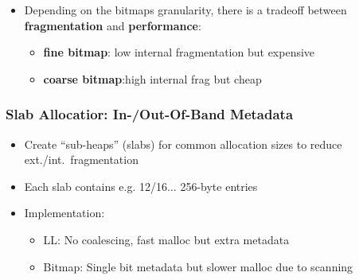 \begin{itemize}
    \item Depending on the bitmaps granularity, there is a tradeoff between \textbf{fragmentation} and \textbf{performance}:%
          \begin{itemize}
              \item \textbf{fine bitmap}: low internal fragmentation but expensive  %
              \item \textbf{coarse bitmap}:high internal frag but cheap  %
          \end{itemize}
\end{itemize}


\subsubsection{Slab Allocatior: In-/Out-Of-Band Metadata}

\begin{itemize}
    \item Create ``sub-heaps'' (slabs) for common allocation sizes to reduce ext./int.\ fragmentation
    \item Each slab contains e.g. 12/16$\dots$ 256-byte entries
    \item Implementation:
          \begin{itemize}
              \item LL: No coalescing, fast malloc but extra metadata
              \item Bitmap: Single bit metadata but slower malloc due to scanning
          \end{itemize}
\end{itemize}

